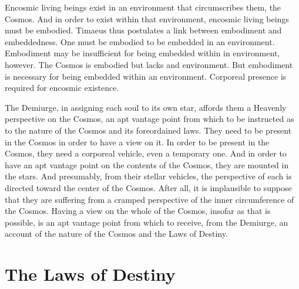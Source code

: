 Encosmic living beings exist in an environment that circumscribes them, the Cosmos. And in order to exist within that environment, encosmic living beings must be embodied. Timaeus thus postulates a link between embodiment and embeddedness. One must be embodied to be embedded in an environment. Embodiment may be insufficient for being embedded within in environment, however. The Cosmos is embodied but lacks and environment. But embodiment is necessary for being embedded within an environment. Corporeal presence is required for encosmic existence.

The Demiurge, in assigning each soul to its own star, affords them a Heavenly perspective on the Cosmos, an apt vantage point from which to be instructed as to the nature of the Cosmos and its foreordained laws. They need to be present in the Cosmos in order to have a view on it. In order to be present in the Cosmos, they need a corporeal vehicle, even a temporary one. And in order to have an apt vantage point on the contents of the Cosmos, they are mounted in the stars. And presumably, from their stellar vehicles, the perspective of each is directed toward the center of the Cosmos. After all, it is implausible to suppose that they are suffering from a cramped perspective of the inner circumference of the Cosmos. Having a view on the whole of the Cosmos, insofar as that is possible, is an apt vantage point from which to receive, from the Demiurge, an account of the nature of the Cosmos and the Laws of Destiny.


\section{The Laws of Destiny} %
\label{sec:the_laws_of_destiny}

